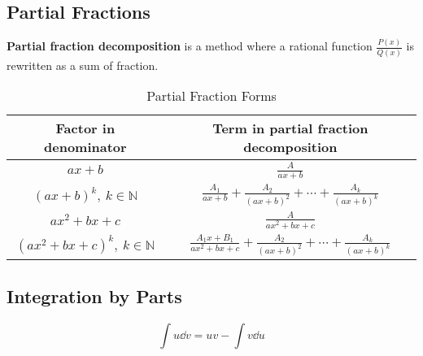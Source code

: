 \documentclass{article}
\begin{document}
\subsection{Partial Fractions}
\begin{definition}
    \textbf{Partial fraction decomposition} is a \linebreak method where a rational function $\displaystyle \frac{P(x)}{Q(x)}$ is rewritten as a sum of fraction.
\end{definition}
\begin{table}[H]
    \renewcommand*{\arraystretch}{1.5}
    \centering
    \begin{tabular}{c | c}
        \toprule
            \textbf{Factor in denominator} & \textbf{Term in partial fraction decomposition} \\
        \midrule
            $ax+b$ & $\displaystyle \frac{A}{ax+b}$ \\[10pt]
            $\left(ax+b\right)^k, \: k \in \mathbb{N}$ & $\displaystyle \frac{A_1}{ax+b} + \frac{A_2}{\left( ax+b \right)^2} + \cdots + \frac{A_k}{\left( ax+b \right)^k}$ \\[10pt]
            $ax^2+bx+c$ & $\displaystyle \frac{A}{ax^2+bx+c}$ \\[10pt]
            $\left(ax^2+bx+c\right)^k, \: k \in \mathbb{N}$ & $\displaystyle \frac{A_1x+B_1}{ax^2+bx+c} + \frac{A_2}{\left( ax+b \right)^2} + \cdots + \frac{A_k}{\left( ax+b \right)^k}$ \\[10pt]
        \bottomrule
    \end{tabular}
    \caption{Partial Fraction Forms}
\end{table}
\subsection{Integration by Parts}
\begin{theorem}
\begin{equation*}
    \int u \dd{v} = uv - \int v \dd{u}
\end{equation*}
\end{theorem}
\end{document}
